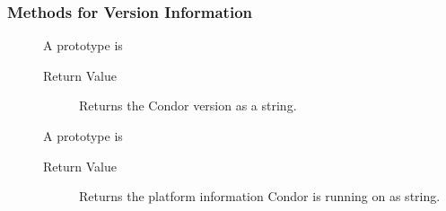 \subsubsection{\label{WebService-VersionInformation} Methods for Version Information}

\begin{description}
\item []
  A prototype is 


  \begin{description}
    \item[ Return Value]
      Returns the Condor version as a string.
  \end{description}  

\item []
  A prototype is 


  \begin{description}
    \item[ Return Value]
      Returns the platform information Condor is running on as string.
  \end{description}  

\end{description}


